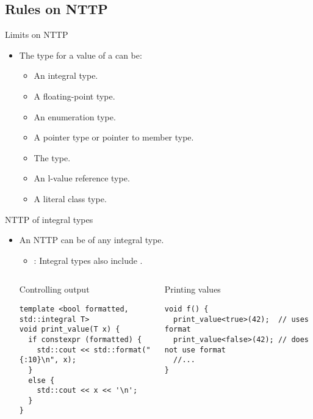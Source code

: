 \subsection{Rules on NTTP}

\begin{frame}[t,fragile]{Limits on NTTP}
\begin{itemize}
  \item The type for a value of a  can be:
    \begin{itemize}
      \item An integral type.
      \item A floating-point type.
      \item An enumeration type.
      \item A pointer type or pointer to member type.
      \item The  type.
      \item An l-value reference type.
      \item A literal class type.
    \end{itemize}
\end{itemize}
\end{frame}

\begin{frame}[t,fragile]{NTTP of integral types}
\begin{itemize}
  \item An NTTP can be of any integral type.
    \begin{itemize}
      \item {}: Integral types also include .
    \end{itemize}

\begin{columns}[T]

\begin{block}{Controlling output}
\begin{lstlisting}
template <bool formatted, std::integral T>
void print_value(T x) {
  if constexpr (formatted) {
    std::cout << std::format("{:10}\n", x);
  }
  else {
    std::cout << x << '\n';
  }
}
\end{lstlisting}
\end{block}

\begin{block}{Printing values}
\begin{lstlisting}
void f() {
  print_value<true>(42);  // uses format
  print_value<false>(42); // does not use format
  //...
}
\end{lstlisting}
\end{block}

\end{columns}

\end{itemize}
\end{frame}


